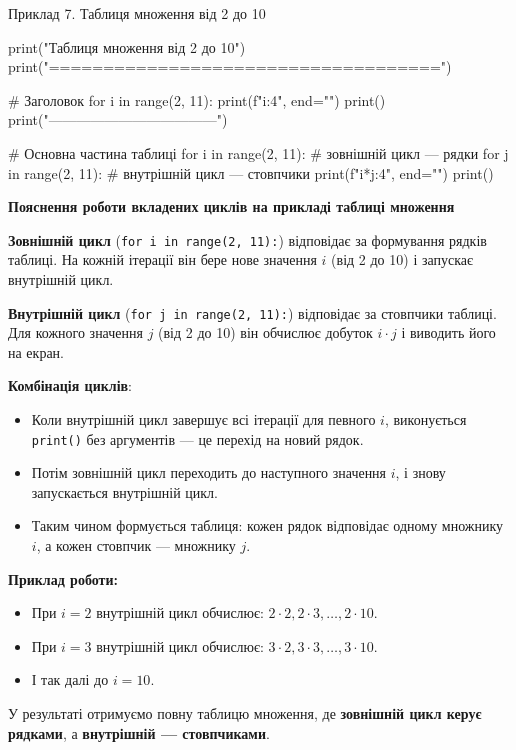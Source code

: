 \begin{py}{Приклад 7. Таблиця множення від 2 до 10}

print("Таблиця множення від 2 до 10")
print("====================================")

# Заголовок
for i in range(2, 11):
    print(f"{i:4}", end="")
print()
print("------------------------------------")

# Основна частина таблиці
for i in range(2, 11):          # зовнішній цикл — рядки
    for j in range(2, 11):      # внутрішній цикл — стовпчики
        print(f"{i*j:4}", end="")
    print()
\end{py}

\textbf{Пояснення роботи вкладених циклів на прикладі таблиці множення}

\textbf{Зовнішній цикл} (\texttt{for i in range(2, 11):}) відповідає за формування рядків таблиці. 
На кожній ітерації він бере нове значення $i$ (від 2 до 10) і запускає внутрішній цикл.

\textbf{Внутрішній цикл} (\texttt{for j in range(2, 11):}) відповідає за стовпчики таблиці. 
Для кожного значення $j$ (від 2 до 10) він обчислює добуток $i \cdot j$ і виводить його на екран.

\textbf{Комбінація циклів}:  
\begin{itemize}
	\item Коли внутрішній цикл завершує всі ітерації для певного $i$, виконується \texttt{print()} без аргументів — це перехід на новий рядок.
	\item Потім зовнішній цикл переходить до наступного значення $i$, і знову запускається внутрішній цикл.
	\item Таким чином формується таблиця: кожен рядок відповідає одному множнику $i$, а кожен стовпчик — множнику $j$.
\end{itemize}

\textbf{Приклад роботи:}
\begin{itemize}
	\item При $i = 2$ внутрішній цикл обчислює: $2 \cdot 2, 2 \cdot 3, \dots, 2 \cdot 10$.
	\item При $i = 3$ внутрішній цикл обчислює: $3 \cdot 2, 3 \cdot 3, \dots, 3 \cdot 10$.
	\item І так далі до $i = 10$.
\end{itemize}

У результаті отримуємо повну таблицю множення, де \textbf{зовнішній цикл керує рядками}, а \textbf{внутрішній — стовпчиками}.

